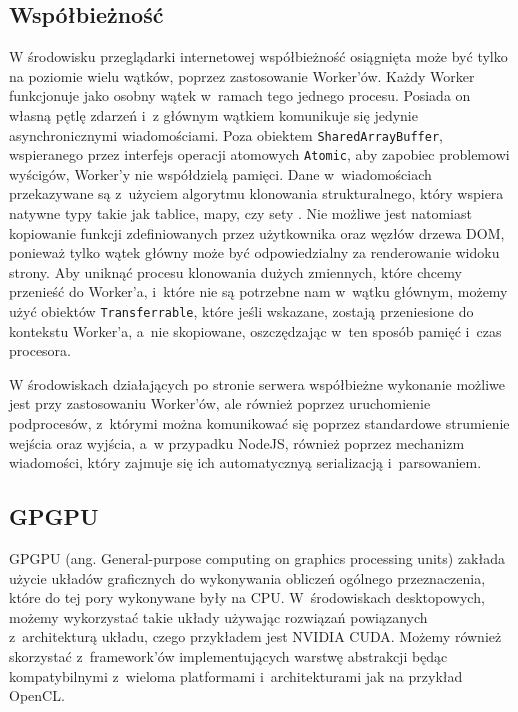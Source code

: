 \subsection{Współbieżność}

W środowisku przeglądarki internetowej współbieżność osiągnięta może być tylko na poziomie wielu wątków, poprzez zastosowanie Worker'ów. Każdy Worker funkcjonuje jako osobny wątek w~ramach tego jednego procesu. Posiada on własną pętlę zdarzeń i~z głównym wątkiem komunikuje się jedynie asynchronicznymi wiadomościami. Poza obiektem \lstinline{SharedArrayBuffer}, wspieranego przez interfejs operacji atomowych \lstinline{Atomic}, aby zapobiec problemowi wyścigów, Worker'y nie współdzielą pamięci. Dane w~wiadomościach przekazywane są z~użyciem algorytmu klonowania strukturalnego, który wspiera natywne typy takie jak tablice, mapy, czy sety \cite{structured-clone}. Nie możliwe jest natomiast kopiowanie funkcji zdefiniowanych przez użytkownika oraz węzłów drzewa DOM, ponieważ tylko wątek główny może być odpowiedzialny za renderowanie widoku strony. Aby uniknąć procesu klonowania dużych zmiennych, które chcemy przenieść do Worker'a, i~które nie są potrzebne nam w~wątku głównym, możemy użyć obiektów \lstinline{Transferrable}, które jeśli wskazane, zostają przeniesione do kontekstu Worker'a, a~nie skopiowane, oszczędzając w~ten sposób pamięć i~czas procesora.

W środowiskach działających po stronie serwera współbieżne wykonanie możliwe jest przy zastosowaniu Worker'ów, ale również poprzez uruchomienie podprocesów, z~którymi można komunikować się poprzez standardowe strumienie wejścia oraz wyjścia, a~w przypadku NodeJS, również poprzez mechanizm wiadomości, który zajmuje się ich automatycznyą serializacją i~parsowaniem. 
 
\subsection{GPGPU}

GPGPU (ang. General-purpose computing on graphics processing units) zakłada użycie układów graficznych do wykonywania obliczeń ogólnego przeznaczenia, które do tej pory wykonywane były na CPU. W~środowiskach desktopowych, możemy wykorzystać takie układy używając rozwiązań powiązanych z~architekturą układu, czego przykładem jest NVIDIA CUDA. Możemy również skorzystać z~framework'ów implementujących warstwę abstrakcji będąc kompatybilnymi z~wieloma platformami i~architekturami jak na przykład OpenCL. 

